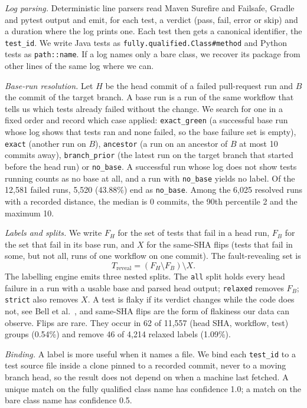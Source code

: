 \documentclass[10pt,conference]{IEEEtran}
\begin{document}
\textit{Log parsing.} Deterministic line parsers read Maven Surefire and Failsafe, Gradle and pytest output and emit, for each test, a verdict (pass, fail, error or skip) and a duration where the log prints one. Each test then gets a canonical identifier, the \texttt{test\_id}. We write Java tests as \texttt{fully.qualified.Class\#method} and Python tests as \texttt{path::name}. If a log names only a bare class, we recover its package from other lines of the same log where we can.

\textit{Base-run resolution.} Let $H$ be the head commit of a failed pull-request run and $B$ the commit of the target branch. A base run is a run of the same workflow that tells us which tests already failed without the change. We search for one in a fixed order and record which case applied: \texttt{exact\_green} (a successful base run whose log shows that tests ran and none failed, so the base failure set is empty), \texttt{exact} (another run on $B$), \texttt{ancestor} (a run on an ancestor of $B$ at most 10 commits away), \texttt{branch\_prior} (the latest run on the target branch that started before the head run) or \texttt{no\_base}. A successful run whose log does not show tests running counts as no base at all, and a run with \texttt{no\_base} yields no label. Of the 12,581 failed runs, 5,520 (43.88\%) end as \texttt{no\_base}. Among the 6,025 resolved runs with a recorded distance, the median is 0 commits, the 90th percentile 2 and the maximum 10.

\textit{Labels and splits.} We write $F_H$ for the set of tests that fail in a head run, $F_B$ for the set that fail in its base run, and $X$ for the same-SHA flips (tests that fail in some, but not all, runs of one workflow on one commit). The fault-revealing set is
\begin{equation}
T_{\text{reveal}} = (F_H \setminus F_B) \setminus X .
\end{equation}
The labelling engine emits three nested splits. The \texttt{all} split holds every head failure in a run with a usable base and parsed head output; \texttt{relaxed} removes $F_B$; \texttt{strict} also removes $X$. A test is flaky if its verdict changes while the code does not, see Bell et al.~\cite{bell2018deflaker}, and same-SHA flips are the form of flakiness our data can observe. Flips are rare. They occur in 62 of 11,557 (head SHA, workflow, test) groups (0.54\%) and remove 46 of 4,214 relaxed labels (1.09\%).

\textit{Binding.} A label is more useful when it names a file. We bind each \texttt{test\_id} to a test source file inside a clone pinned to a recorded commit, never to a moving branch head, so the result does not depend on when a machine last fetched. A unique match on the fully qualified class name has confidence 1.0; a match on the bare class name has confidence 0.5.
\end{document}
